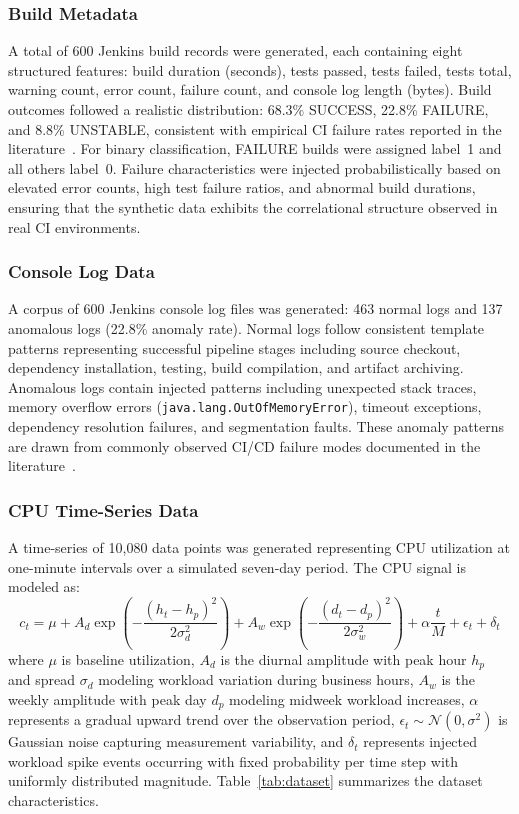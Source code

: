 \documentclass[sn-nature]{sn-jnl}
\theoremstyle{thmstyleone}
\theoremstyle{thmstyletwo}
\theoremstyle{thmstylethree}
\begin{document}
\subsubsection{Build Metadata}
A total of 600 Jenkins build records were generated, each containing eight structured features: build duration (seconds), tests passed, tests failed, tests total, warning count, error count, failure count, and console log length (bytes).
Build outcomes followed a realistic distribution: 68.3\% SUCCESS, 22.8\% FAILURE, and 8.8\% UNSTABLE, consistent with empirical CI failure rates reported in the literature~\cite{rausch2017empirical}.
For binary classification, FAILURE builds were assigned label~1 and all others label~0.
Failure characteristics were injected probabilistically based on elevated error counts, high test failure ratios, and abnormal build durations, ensuring that the synthetic data exhibits the correlational structure observed in real CI environments.

\subsubsection{Console Log Data}
A corpus of 600 Jenkins console log files was generated: 463 normal logs and 137 anomalous logs (22.8\% anomaly rate).
Normal logs follow consistent template patterns representing successful pipeline stages including source checkout, dependency installation, testing, build compilation, and artifact archiving.
Anomalous logs contain injected patterns including unexpected stack traces, memory overflow errors (\texttt{java.lang.OutOfMemoryError}), timeout exceptions, dependency resolution failures, and segmentation faults.
These anomaly patterns are drawn from commonly observed CI/CD failure modes documented in the literature~\cite{he2016experience, xu2009logmining}.

\subsubsection{CPU Time-Series Data}
A time-series of 10,080 data points was generated representing CPU utilization at one-minute intervals over a simulated seven-day period.
The CPU signal is modeled as:
\begin{equation}\label{eq:cpusignal}
c_t = \mu + A_d \exp\!\left(-\frac{(h_t - h_p)^2}{2\sigma_d^2}\right) + A_w \exp\!\left(-\frac{(d_t - d_p)^2}{2\sigma_w^2}\right) + \alpha \frac{t}{M} + \epsilon_t + \delta_t
\end{equation}
where $\mu$ is baseline utilization, $A_d$ is the diurnal amplitude with peak hour $h_p$ and spread $\sigma_d$ modeling workload variation during business hours, $A_w$ is the weekly amplitude with peak day $d_p$ modeling midweek workload increases, $\alpha$ represents a gradual upward trend over the observation period, $\epsilon_t \sim \mathcal{N}(0, \sigma^2)$ is Gaussian noise capturing measurement variability, and $\delta_t$ represents injected workload spike events occurring with fixed probability per time step with uniformly distributed magnitude.
Table~\ref{tab:dataset} summarizes the dataset characteristics.
\end{document}
